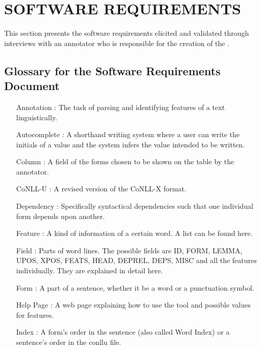 \chapter{SOFTWARE REQUIREMENTS}
\label{chapter:requirements}

This section presents the software requirements elicited and validated through interviews with an annotator who is responsible for the creation of the \bountreebank.

\section{Glossary for the Software Requirements Document}

\begin{itemize}[before=\normalfont, font=\itshape, align=left]

    \item[Annotation]: The task of parsing and identifying features of a text linguistically.

    \item[Autocomplete]: A shorthand writing system where a user can write the initials of a value and the system infers the value intended to be written.

    \item[Column]: A field of the forms chosen to be shown on the table by the annotator.

    \item[CoNLL-U]: A revised version of the CoNLL-X format.

    \item[Dependency]: Specifically syntactical dependencies such that one individual form depends upon another.

    \item[Feature]: A kind of information of a certain word. A list can be found here.

    \item[Field]: Parts of word lines. The possible fields are ID, FORM, LEMMA, UPOS, XPOS, FEATS, HEAD, DEPREL, DEPS, MISC and all the features individually. They are explained in detail here.

    \item[Form]: A part of a sentence, whether it be a word or a punctuation symbol.

    \item[Help Page]: A web page explaining how to use the tool and possible values for features.

    \item[Index]: A form's order in the sentence (also called Word Index) or a sentence's order in the conllu file.


\end{itemize}

